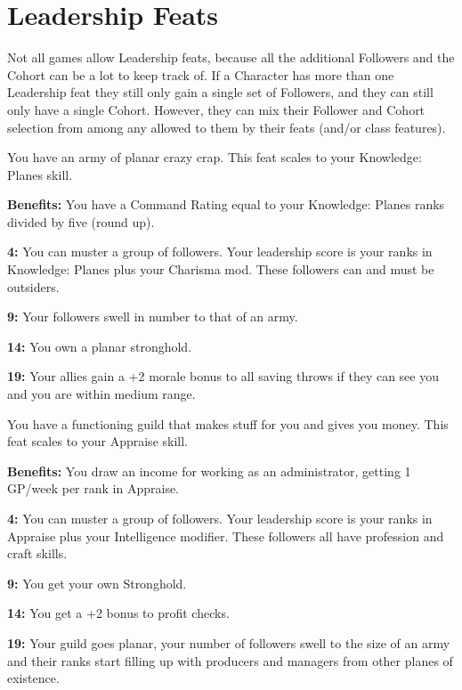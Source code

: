 \section{Leadership Feats}

Not all games allow Leadership feats, because all the additional Followers and the Cohort can be a lot to keep track of. If a Character has more than one Leadership feat they still only gain a single set of Followers, and they can still only have a single Cohort. However, they can mix their Follower and Cohort selection from among any allowed to them by their feats (and/or class features).


You have an army of planar crazy crap. This feat scales to your Knowledge: Planes skill.

\textbf{Benefits:} You have a Command Rating equal to your Knowledge: Planes ranks divided by five (round up).

\textbf{4:} You can muster a group of followers. Your leadership score is your ranks in Knowledge: Planes plus your Charisma mod. These followers can and must be outsiders.

\textbf{9:} Your followers swell in number to that of an army.

\textbf{14:} You own a planar stronghold.

\textbf{19:} Your allies gain a +2 morale bonus to all saving throws if they can see you and you are within medium range.


You have a functioning guild that makes stuff for you and gives you money. This feat scales to your Appraise skill.

\textbf{Benefits:} You draw an income for working as an administrator, getting 1 GP/week per rank in Appraise.

\textbf{4:} You can muster a group of followers. Your leadership score is your ranks in Appraise plus your Intelligence modifier. These followers all have profession and craft skills.

\textbf{9:} You get your own Stronghold.

\textbf{14:} You get a +2 bonus to profit checks.

\textbf{19:} Your guild goes planar, your number of followers swell to the size of an army and their ranks start filling up with producers and managers from other planes of existence.

